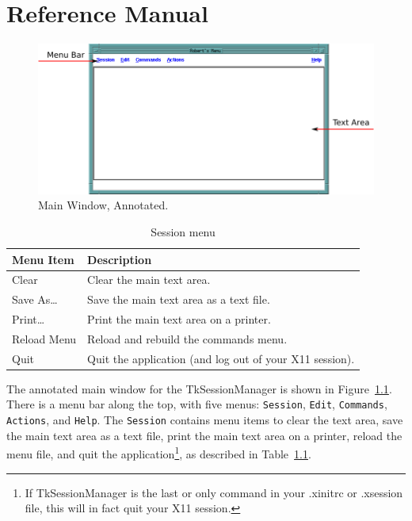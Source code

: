 \chapter{Reference Manual}
\label{chpt:ReferenceManual}

\begin{figure}[hbpt]
\begin{centering}
\includegraphics[width=5in]{MainWindowAnnotated.png}
\caption{Main Window, Annotated.}
\label{ref:fig:mainwindow}
\end{centering}
\end{figure}
\begin{table}[hbpt]
\begin{centering}
\begin{tabular}{|l|p{3in}|}
\hline
Menu Item & Description \\
\hline
\hline
Clear & Clear the main text area. \\
\hline
Save As\ldots & Save the main text area as a text file. \\
\hline
Print\ldots & Print the main text area on a printer. \\
\hline
Reload Menu & Reload and rebuild the commands menu. \\
\hline
Quit & Quit the application (and log out of your X11  session). \\
\hline
\end{tabular}
\caption{Session menu}
\label{ref:tab:sessionmenu}
\end{centering}
\end{table}
The annotated main window for the TkSessionManager is shown in
Figure~\ref{ref:fig:mainwindow}.  There is a menu bar along the top,
with five menus: \texttt{Session}, \texttt{Edit}, \texttt{Commands}, 
\texttt{Actions}, and \texttt{Help}.  The \texttt{Session} contains menu
items to clear the text area, save the main text area as a text file,
print the main text area on a printer, reload the menu file, and quit
the application\footnote{If TkSessionManager is the last or only command
in your .xinitrc or .xsession file, this will in fact quit your X11
session.}, as described in Table~\ref{ref:tab:sessionmenu}.


